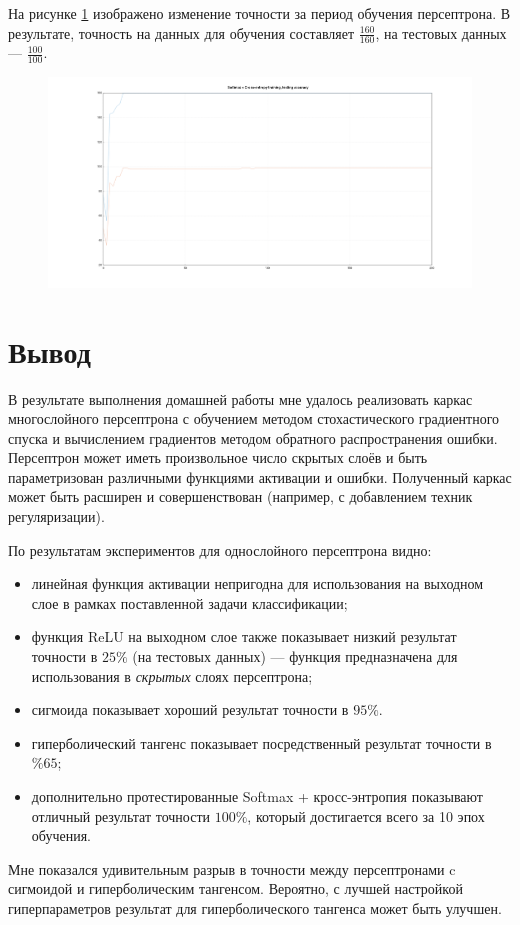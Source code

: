 \documentclass[a4paper, 14pt]{extarticle}
\begin{document}
На рисунке \ref{fig:softmax_cross_entropy_accuracy} изображено изменение точности за период обучения персептрона.
В результате, точность на данных для обучения составляет $\frac{160}{160}$, на тестовых данных --- $\frac{100}{100}$.

\begin{figure}[!htb]
  \centering\includegraphics[width=\textwidth]{images/softmax_cross_entropy_accuracy.png}
  \caption{}
  \label{fig:softmax_cross_entropy_accuracy}
\end{figure}

\section{Вывод}

В результате выполнения домашней работы мне удалось реализовать каркас многослойного персептрона с обучением методом стохастического градиентного
спуска и вычислением градиентов методом обратного распространения ошибки. Персептрон может иметь произвольное число скрытых слоёв и быть параметризован
различными функциями активации и ошибки. Полученный каркас может быть расширен и совершенствован (например, с добавлением техник регуляризации).

По результатам экспериментов для однослойного персептрона видно:
\begin{itemize}
  \item линейная функция активации непригодна для использования на выходном слое в рамках поставленной задачи классификации;
  \item функция ReLU на выходном слое также показывает низкий результат точности в $25\%$ (на тестовых данных) --- функция предназначена для
    использования в \textit{скрытых} слоях персептрона;
  \item сигмоида показывает хороший результат точности в $95\%$.
  \item гиперболический тангенс показывает посредственный результат точности в $\%65$;
  \item дополнительно протестированные Softmax + кросс-энтропия показывают отличный результат точности $100\%$, который достигается всего за 10 эпох
    обучения.
\end{itemize}

Мне показался удивительным разрыв в точности между персептронами c сигмоидой и гиперболическим тангенсом. Вероятно, с лучшей настройкой гиперпараметров
результат для гиперболического тангенса может быть улучшен.
\end{document}
